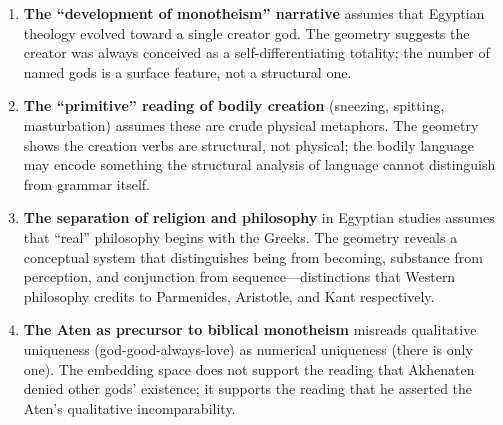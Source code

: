 \documentclass[11pt, a4paper]{article}
\begin{document}
\begin{enumerate}
    \item \textbf{The ``development of monotheism'' narrative} assumes that Egyptian theology evolved toward a single creator god. The geometry suggests the creator was always conceived as a self-differentiating totality; the number of named gods is a surface feature, not a structural one.

    \item \textbf{The ``primitive'' reading of bodily creation} (sneezing, spitting, masturbation) assumes these are crude physical metaphors. The geometry shows the creation verbs are structural, not physical; the bodily language may encode something the structural analysis of language cannot distinguish from grammar itself.

    \item \textbf{The separation of religion and philosophy} in Egyptian studies assumes that ``real'' philosophy begins with the Greeks. The geometry reveals a conceptual system that distinguishes being from becoming, substance from perception, and conjunction from sequence---distinctions that Western philosophy credits to Parmenides, Aristotle, and Kant respectively.

    \item \textbf{The Aten as precursor to biblical monotheism} misreads qualitative uniqueness (god-good-always-love) as numerical uniqueness (there is only one). The embedding space does not support the reading that Akhenaten denied other gods' existence; it supports the reading that he asserted the Aten's qualitative incomparability.
\end{enumerate}
\end{document}
